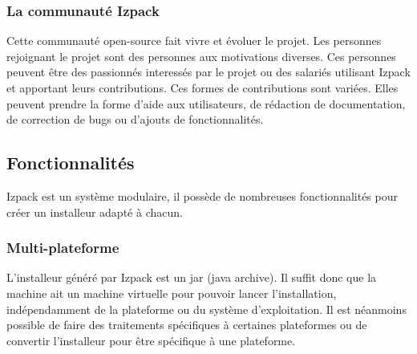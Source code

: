 \subsubsection{La communauté Izpack}
Cette communauté open-source fait vivre et évoluer le projet. Les personnes rejoignant le projet sont des personnes aux motivations diverses.
Ces personnes peuvent être des passionnés interessés par le projet ou des salariés utilisant Izpack et apportant leurs contributions.
Ces formes de contributions sont variées.
Elles peuvent prendre la forme d'aide aux utilisateurs, de rédaction de documentation, de correction de bugs ou d'ajouts de fonctionnalités.
\subsection{Fonctionnalités}
Izpack est un système modulaire, il possède de nombreuses fonctionnalités pour créer un installeur adapté à chacun.
\subsubsection{Multi-plateforme}
L'installeur généré par Izpack est un jar (java archive).
Il suffit donc que la machine ait un machine virtuelle pour pouvoir lancer l'installation, indépendamment de la plateforme ou du système d'exploitation.
Il est néanmoins possible de faire des traitements spécifiques à certaines plateformes ou de convertir l'installeur pour être spécifique à une plateforme.
